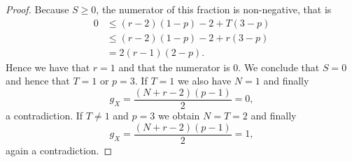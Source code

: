 \begin{proof}
    Because $S \geq 0$, the numerator of this fraction is non-negative, that is
        \begin{align*}
        0 & \le (r-2)(1-p) - 2 + T (3-p)\\ 
        & \le  (r-2)(1-p) - 2 + r (3-p)\\
        &= 2 (r-1)(2-p).
        \end{align*}
    Hence we have that $r=1$ and that the numerator is $0$. 
    We conclude that $S=0$ and hence that $T=1$ or $p=3$. 
    If $T=1$ we also have $N=1$ and finally
        \[
        g_X = \frac{(N+r-2)(p-1)}{2} = 0,
        \]
    a contradiction.
    If $T \not=1$ and $p=3$ we obtain $N=T=2$ and finally 
        \[
        g_X = \frac{(N+r-2)(p-1)}{2} =1,
        \] 
    again a contradiction.
    \end{proof}

